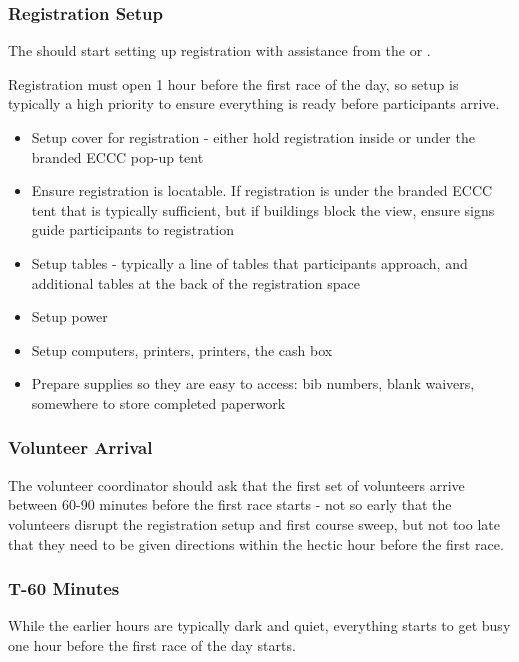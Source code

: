 \subsubsection{Registration Setup}

The  should start setting up registration with assistance from the  or .

Registration must open 1 hour before the first race of the day, so setup is typically a high priority to ensure everything is ready before participants arrive.

\begin{itemize}
  \item Setup cover for registration - either hold registration inside or under the branded ECCC pop-up tent
  \item Ensure registration is locatable. If registration is under the branded ECCC tent that is typically sufficient, but if buildings block the view,
    ensure signs guide participants to registration
  \item Setup tables - typically a line of tables that participants approach, and additional tables at the back of the registration space
  \item Setup power
  \item Setup computers, printers, printers, the cash box
  \item Prepare supplies so they are easy to access: bib numbers, blank waivers, somewhere to store completed paperwork
\end{itemize}

\subsubsection{Volunteer Arrival}

The volunteer coordinator should ask that the first set of volunteers arrive between 60-90 minutes before the first race starts -
not so early that the volunteers disrupt the registration setup and first course sweep, but not too late that they need to be given directions
within the hectic hour before the first race.

\subsubsection{T-60 Minutes}

While the earlier hours are typically dark and quiet, everything starts to get busy one hour before the first race of the day starts.

